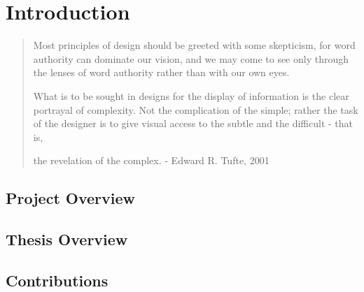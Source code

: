 \resetdatestamp

\chapter{Introduction}

\begin{quote}
Most principles of design should be greeted with some skepticism, for word authority can dominate our vision, and we may come to see only through the lenses of word authority rather than with our own eyes.

What is to be sought in designs for the display of information is the clear portrayal of complexity. Not the complication of the simple; rather the task of the designer is to give visual access to the subtle and the difficult - that is,

the revelation of the complex. - Edward R. Tufte, 2001
\end{quote}

\begin{comment}
A thesis should present results in a scholarly fashion.
The following discusses the organization of a thesis, such as would be
 appropriate to presenting research results pertaining to Electrical \&
 Computer Engineering.
\end{comment}

\section{Project Overview}

\begin{comment}
The terms of reference differ for a Master's Thesis and a Doctoral Thesis.
For the Master's Thesis, the Faculty of Graduate Studies and Research at
McGill University \cite{McGillTG:P1994} gives the following guidelines.

The terms of reference state that ``In most disciplines, Master's theses will
 not exceed 100 pages.''
\end{comment}

\section{Thesis Overview}

\section{Contributions}
